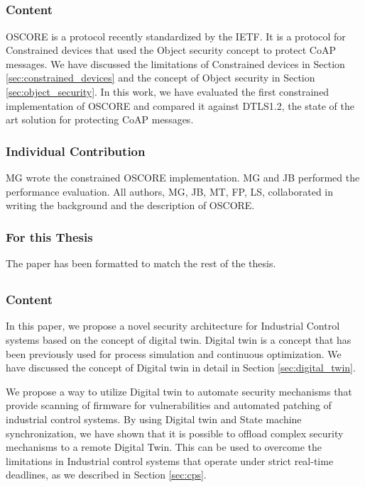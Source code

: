 \subsection{\paperIIItitle}
\subsubsection{Content}
OSCORE is a protocol recently standardized by the IETF. It is a protocol for Constrained devices that used the Object security concept to protect CoAP messages. We have discussed the limitations of Constrained devices in Section \ref{sec:constrained_devices} and the concept of Object security in Section \ref{sec:object_security}. In this work, we have evaluated the first constrained implementation of OSCORE and compared it against DTLS1.2, the state of the art solution for protecting CoAP messages. 
\subsubsection{Individual Contribution}
MG wrote the constrained OSCORE implementation. MG and JB performed the performance evaluation. All authors, MG, JB, MT, FP, LS, collaborated in writing the background and the description of OSCORE.
\subsubsection{For this Thesis}
The paper has been formatted to match the rest of the thesis.

\subsection{\paperIVtitle}
\subsubsection{Content}
In this paper, we propose a novel security architecture for Industrial Control systems based on the concept of digital twin. Digital twin is a concept that has been previously used for process simulation and continuous optimization. We have discussed the concept of Digital twin in detail in Section \ref{sec:digital_twin}. 

We propose a way to utilize Digital twin to automate security mechanisms that provide scanning of firmware for vulnerabilities and automated patching of industrial control systems. By using Digital twin and State machine synchronization, we have shown that it is possible to offload complex security mechanisms to a remote Digital Twin. This can be used to overcome the limitations in Industrial control systems that operate under strict real-time deadlines, as we described in Section \ref{sec:cps}. 
